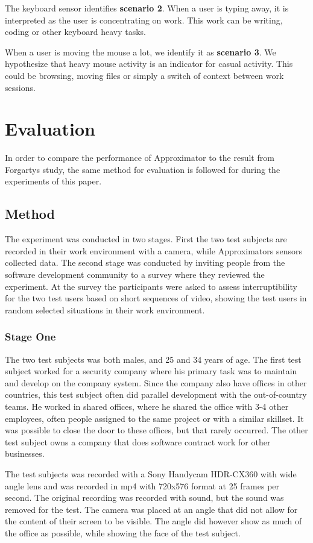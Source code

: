 \documentclass{sigchi}
\begin{document}
The keyboard sensor identifies \textbf{scenario 2}.
When a user is typing away, it is interpreted as the user is concentrating on work.
This work can be writing, coding or other keyboard heavy tasks.

When a user is moving the mouse a lot, we identify it as \textbf{scenario 3}.
We hypothesize that heavy mouse activity is an indicator for casual activity.
This could be browsing, moving files or simply a switch of context between work sessions.

\section{Evaluation}
In order to compare the performance of Approximator to the result from Forgartys study, the same method for evaluation is followed for during the experiments of this paper.

\subsection{Method}
The experiment was conducted in two stages.
First the two test subjects are recorded in their work environment with a camera, while Approximators sensors collected data.
The second stage was conducted by inviting people from the software development community to a survey where they reviewed the experiment.
At the survey the participants were asked to assess interruptibility for the two test users based on short sequences of video, showing the test users in random selected situations in their work environment.

\subsubsection{Stage One}
The two test subjects was both males, and 25 and 34 years of age.
The first test subject worked for a security company where his primary task was to maintain and develop on the company system.
Since the company also have offices in other countries, this test subject often did parallel development with the out-of-country teams.
He worked in shared offices, where he shared the office with 3-4 other employees, often people assigned to the same project or with a similar skillset.
It was possible to close the door to these offices, but that rarely occurred.
The other test subject owns a company that does software contract work for other businesses.

The test subjects was recorded with a Sony Handycam HDR-CX360 with wide angle lens and was recorded in mp4 with 720x576 format at 25 frames per second.
The original recording was recorded with sound, but the sound was removed for the test.
The camera was placed at an angle that did not allow for the content of their screen to be visible.
The angle did however show as much of the office as possible, while showing the face of the test subject.
\end{document}
